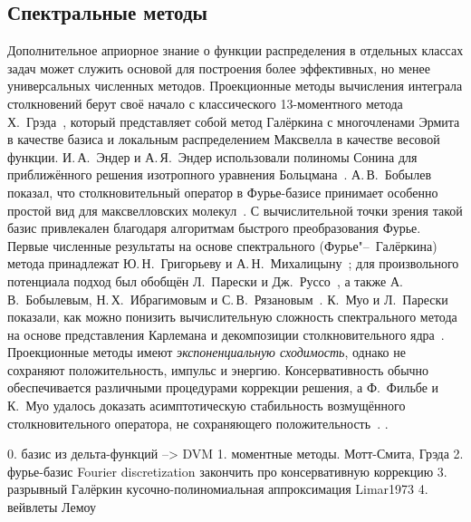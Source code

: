 
\subsection{Спектральные методы}

Дополнительное априорное знание о функции распределения в отдельных классах задач может служить
основой для построения более эффективных, но менее универсальных численных методов.
Проекционные методы вычисления интеграла столкновений берут своё начало с классического
13-моментного метода Х.~Грэда~\autocite{Grad1949}, который представляет собой метод Галёркина
с многочленами Эрмита в качестве базиса и локальным распределением Максвелла в качестве весовой функции.
И.\,А.~Эндер и А.\,Я.~Эндер использовали полиномы Сонина
для приближённого решения изотропного уравнения Больцмана~\autocite{Ender1970}.
А.\,В.~Бобылев показал, что столкновительный оператор в Фурье-базисе принимает особенно простой вид
для максвелловских молекул~\autocite{Bobylev1975}.
С вычислительной точки зрения такой базис привлекален благодаря алгоритмам быстрого преобразования Фурье.
Первые численные результаты на основе спектрального (Фурье"--~Галёркина) метода принадлежат
Ю.\,Н.~Григорьеву и А.\,Н.~Михалицыну~\autocite{Grigoriev1983};
для произвольного потенциала подход был обобщён Л.~Парески и Дж.~Руссо~\autocite{Pareschi2000method},
а также А.\,В.~Бобылевым, Н.\,Х.~Ибрагимовым и С.\,В.~Рязановым~\autocite{Rjasanow1999, Ibragimov2002}.
К.~Муо и Л.~Парески показали, как можно понизить вычислительную сложность спектрального метода
на основе представления Карлемана и декомпозиции столкновительного ядра~\autocite{Pareschi2006}.
Проекционные методы имеют \emph{экспоненциальную сходимость}, однако не сохраняют положительность, импульс и энергию.
Консервативность обычно обеспечивается различными процедурами коррекции решения,
а Ф.~Фильбе и К.~Муо удалось доказать асимптотическую стабильность возмущённого столкновительного оператора,
не сохраняющего положительность~\autocite{Filbet2011}.
.



0. базис из дельта-функций --> DVM
1. моментные методы. Мотт-Смита, Грэда
2. фурье-базис Fourier discretization закончить про консервативную коррекцию
3. разрывный Галёркин кусочно-полиномиальная аппроксимация Limar1973
4. вейвлеты Лемоу

